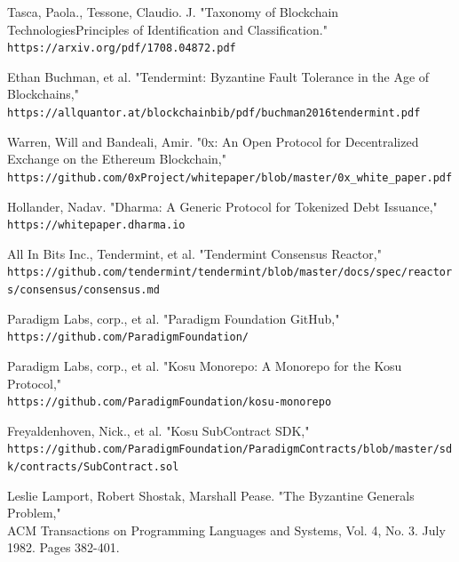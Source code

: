 \documentclass[10pt]{article}
\begin{document}
\begin{thebibliography}{9}

Tasca, Paola., Tessone, Claudio. J. "Taxonomy of Blockchain TechnologiesPrinciples of Identification and Classification."
\\\texttt{https://arxiv.org/pdf/1708.04872.pdf}

Ethan Buchman, et al. "Tendermint: Byzantine Fault Tolerance in the Age of Blockchains,"
\\\small\texttt{https://allquantor.at/blockchainbib/pdf/buchman2016tendermint.pdf}

Warren, Will and Bandeali, Amir. "0x: An Open Protocol for Decentralized Exchange on the Ethereum Blockchain,"
\\\texttt{https://github.com/0xProject/whitepaper/blob/master/0x\_white\_paper.pdf}

Hollander, Nadav. "Dharma: A Generic Protocol for Tokenized Debt Issuance,"
\\\texttt{https://whitepaper.dharma.io}

All In Bits Inc., Tendermint, et al. "Tendermint Consensus Reactor,"
\\\small\texttt{https://github.com/tendermint/tendermint/blob/master/docs/spec/reactors/consensus/consensus.md}

Paradigm Labs, corp., et al. "Paradigm Foundation GitHub,"
\\\small\texttt{https://github.com/ParadigmFoundation/}

Paradigm Labs, corp., et al. "Kosu Monorepo: A Monorepo for the Kosu Protocol,"
\\\small\texttt{https://github.com/ParadigmFoundation/kosu-monorepo}

Freyaldenhoven, Nick., et al. "Kosu SubContract SDK,"
\\\small\texttt{https://github.com/ParadigmFoundation/ParadigmContracts/blob/master/sdk/contracts/SubContract.sol}

Leslie Lamport, Robert Shostak, Marshall Pease. "The Byzantine Generals Problem,"
\\ACM Transactions on Programming Languages and Systems, Vol. 4, No. 3. July 1982. Pages 382-401.

\end{thebibliography}


\end{document}
